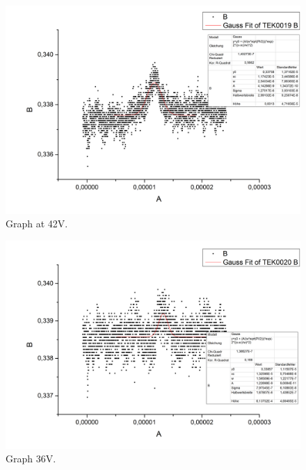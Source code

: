 \begin{figure}[h]
\begin{center}
\includegraphics[scale=0.25]{Bilder/Teil2/23}
\caption{Graph at 42V.}
\label{fig:23}
\end{center}
\end{figure}
\begin{figure}[h]
\begin{center}
\includegraphics[scale=0.25]{Bilder/Teil2/24}
\caption{Graph 36V.}
\label{fig:24}
\end{center}
\end{figure}
